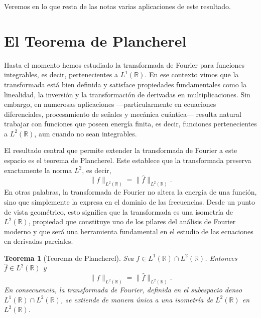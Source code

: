 \documentclass[12pt, a4paper]{amsbook}
\newcommand{\R}{{\mathbb R}}
\newtheorem{teo}{Teorema}[section]
\theoremstyle{remark}
\theoremstyle{definition}
\numberwithin{section}{chapter}
\numberwithin{subsection}{section}
\numberwithin{equation}{section}
\numberwithin{figure}{chapter}
\begin{document}
Veremos en lo que resta de las notas varias aplicaciones de este resultado.

\section{El Teorema de Plancherel}

Hasta el momento hemos estudiado la transformada de Fourier para funciones integrables, es decir, pertenecientes a $L^1(\R)$. En ese contexto vimos que la transformada está bien definida y satisface propiedades fundamentales como la linealidad, la inversión y la transformación de derivadas en multiplicaciones. Sin embargo, en numerosas aplicaciones —particularmente en ecuaciones diferenciales, procesamiento de señales y mecánica cuántica— resulta natural trabajar con funciones que poseen energía finita, es decir, funciones pertenecientes a $L^2(\R)$, aun cuando no sean integrables.

El resultado central que permite extender la transformada de Fourier a este espacio es el teorema de Plancherel. Este establece que la transformada preserva exactamente la norma $L^2$, es decir,
$$
\|f\|_{L^2(\R)} = \|\widehat f\|_{L^2(\R)}.
$$
En otras palabras, la transformada de Fourier no altera la energía de una función, sino que simplemente la expresa en el dominio de las frecuencias. Desde un punto de vista geométrico, esto significa que la transformada es una isometría de $L^2(\R)$, propiedad que constituye uno de los pilares del análisis de Fourier moderno y que será una herramienta fundamental en el estudio de las ecuaciones en derivadas parciales.

\begin{teo}[Teorema de Plancherel]\label{teo:plancherel-transformada}
Sea $f\in L^1(\R)\cap L^2(\R)$. Entonces $\hat f\in L^2(\R)$ y
$$
\|f\|_{L^2(\R)} = \|\hat f\|_{L^2(\R)}.
$$
En consecuencia, la transformada de Fourier, definida en el subespacio denso $L^1(\R)\cap L^2(\R)$, se extiende de manera única a una isometría de $L^2(\R)$ en $L^2(\R)$.
\end{teo}
\end{document}
